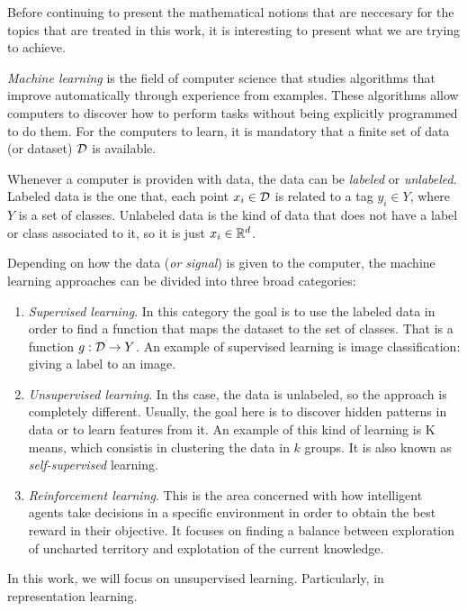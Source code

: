 


Before continuing to present the mathematical notions that are neccesary for the topics that are treated in this work, it is interesting to present what we are trying to achieve.

\emph{Machine learning} is the field of computer science that studies algorithms that improve automatically through experience from examples. 
These algorithms allow computers to discover how to
perform tasks without being explicitly programmed to do them. For the computers to learn, it is mandatory that a finite set of data (or dataset) $\mathcal{D}$ is available. 

Whenever a computer is providen with data, the data can be \emph{labeled} or \emph{unlabeled}. Labeled data is the one that, each point $x_i \in \mathcal{D}$ is related to a tag $y_i \in Y$, where $Y$ is a set of classes.
Unlabeled data is the kind of data that does not have a label or class associated to it, so it is just $x_i \in \mathbb{R}^d$. 

Depending on how the data (\emph{or signal}) is given to the computer, the machine learning approaches can be divided into three broad categories:
\begin{enumerate}
    \item \emph{Supervised learning}. In this category the goal is to use the labeled data in order to find a function that maps the dataset to the set of classes. That is a function $g:\mathcal{D} \to Y$. 
    An example of supervised learning is image classification: giving a label to an image.
    \item \emph{Unsupervised learning}. In ths case, the data is unlabeled, so the approach is completely different. Usually, the goal here is to discover hidden patterns in data or to learn features from it.
    An example of this kind of learning is K means, which consistis in clustering the data in $k$ groups. It is also known as \emph{self-supervised} learning.
    \item \emph{Reinforcement learning}. This is the area concerned with how intelligent agents take decisions in a specific environment in order to obtain the best reward in their objective. It focuses on finding a balance between exploration of uncharted territory and explotation of the current knowledge.

\end{enumerate}

In this work, we will focus on unsupervised learning. Particularly, in representation learning.\\


